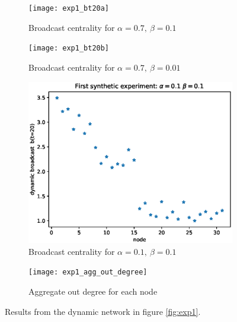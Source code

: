 \begin{figure}[h]
     \centering
     \begin{subfigure}[b]{0.4\textwidth}
         \centering
         \texttt{[image: exp1\_bt20a]}
         \caption{Broadcast centrality for $\alpha = 0.7 ,~\beta = 0.1$}
         \label{fig:bt1}
     \end{subfigure}
     \hspace{0.5cm}
     \begin{subfigure}[b]{0.4\textwidth}
         \centering
         \texttt{[image: exp1\_bt20b]}
         \caption{Broadcast centrality for $\alpha = 0.7 ,~\beta = 0.01$}
         \label{fig:bt2}
     \end{subfigure}
     
     \begin{subfigure}[b]{0.4\textwidth}
         \centering
         \includegraphics[width=\textwidth]{exp1_bt20c}
         \caption{Broadcast centrality for $\alpha = 0.1 ,~\beta = 0.1$}
         \label{fig:bt3}
     \end{subfigure}
     \hspace{0.5cm}
     \begin{subfigure}[b]{0.4\textwidth}
         \centering
         \texttt{[image: exp1\_agg\_out\_degree]}
         \caption{Aggregate out degree for each node}
         \label{fig:bt4}
     \end{subfigure}
        \caption{Results from the dynamic network in figure \ref{fig:exp1}.}
        \label{fig:fourbt}
\end{figure}

